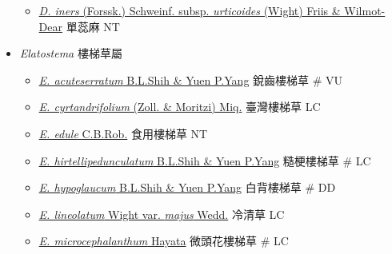 \begin{itemize}
  \begin{itemize}
        \item[] \href{http://www.theplantlist.org/tpl1.1/search?q=Droguetia+iners+subsp.+urticoides}{\textit{D. iners} (Forssk.) Schweinf. subsp. \textit{urticoides} (Wight) Friis \& Wilmot-Dear}   單蕊麻   NT
  \end{itemize}
 \item[] \textit{Elatostema} 樓梯草屬
                                
  \begin{itemize}
        \item[] \href{http://www.theplantlist.org/tpl1.1/search?q=Elatostema+acuteserratum}{\textit{E. acuteserratum} B.L.Shih \& Yuen P.Yang}   銳齒樓梯草  \# VU
        \item[] \href{http://www.theplantlist.org/tpl1.1/search?q=Elatostema+cyrtandrifolium}{\textit{E. cyrtandrifolium} (Zoll. \& Moritzi) Miq.}   臺灣樓梯草   LC
        \item[] \href{http://www.theplantlist.org/tpl1.1/search?q=Elatostema+edule}{\textit{E. edule} C.B.Rob.}   食用樓梯草   NT
        \item[] \href{http://www.theplantlist.org/tpl1.1/search?q=Elatostema+hirtellipedunculatum}{\textit{E. hirtellipedunculatum} B.L.Shih \& Yuen P.Yang}   糙梗樓梯草  \# LC
        \item[] \href{http://www.theplantlist.org/tpl1.1/search?q=Elatostema+hypoglaucum}{\textit{E. hypoglaucum} B.L.Shih \& Yuen P.Yang}   白背樓梯草  \# DD
        \item[] \href{http://www.theplantlist.org/tpl1.1/search?q=Elatostema+lineolatum+var.+majus}{\textit{E. lineolatum} Wight var. \textit{majus} Wedd.}   冷清草   LC
        \item[] \href{http://www.theplantlist.org/tpl1.1/search?q=Elatostema+microcephalanthum}{\textit{E. microcephalanthum} Hayata}   微頭花樓梯草  \# LC

\end{itemize}
\end{itemize}
